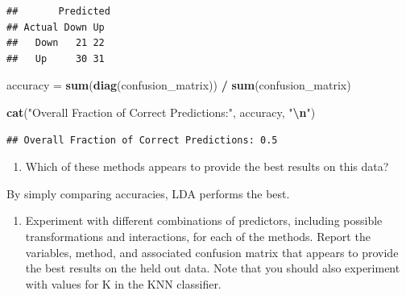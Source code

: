 \documentclass[
]{article}
\newenvironment{Shaded}{\begin{snugshade}}{\end{snugshade}}
\newcommand{\AttributeTok}[1]{\textcolor[rgb]{0.13,0.29,0.53}{#1}}
\newcommand{\DecValTok}[1]{\textcolor[rgb]{0.00,0.00,0.81}{#1}}
\newcommand{\FunctionTok}[1]{\textcolor[rgb]{0.13,0.29,0.53}{\textbf{#1}}}
\newcommand{\NormalTok}[1]{#1}
\newcommand{\OtherTok}[1]{\textcolor[rgb]{0.56,0.35,0.01}{#1}}
\newcommand{\SpecialCharTok}[1]{\textcolor[rgb]{0.81,0.36,0.00}{\textbf{#1}}}
\newcommand{\StringTok}[1]{\textcolor[rgb]{0.31,0.60,0.02}{#1}}
\providecommand{\tightlist}{%
  \setlength{\itemsep}{0pt}\setlength{\parskip}{0pt}}
\begin{document}
\begin{Shaded}
\end{Shaded}

\begin{verbatim}
##       Predicted
## Actual Down Up
##   Down   21 22
##   Up     30 31
\end{verbatim}

\begin{Shaded}
\begin{Highlighting}[]
\NormalTok{accuracy }\OtherTok{=} \FunctionTok{sum}\NormalTok{(}\FunctionTok{diag}\NormalTok{(confusion\_matrix)) }\SpecialCharTok{/} \FunctionTok{sum}\NormalTok{(confusion\_matrix)}

\FunctionTok{cat}\NormalTok{(}\StringTok{"Overall Fraction of Correct Predictions:"}\NormalTok{, accuracy, }\StringTok{"}\SpecialCharTok{\textbackslash{}n}\StringTok{"}\NormalTok{)}
\end{Highlighting}
\end{Shaded}

\begin{verbatim}
## Overall Fraction of Correct Predictions: 0.5
\end{verbatim}

\begin{enumerate}
\def\labelenumi{(\alph{enumi})}
\setcounter{enumi}{7}
\tightlist
\item
  Which of these methods appears to provide the best results on this
  data?
\end{enumerate}

By simply comparing accuracies, LDA performs the best.

\begin{enumerate}
\def\labelenumi{(\roman{enumi})}
\tightlist
\item
  Experiment with different combinations of predictors, including
  possible transformations and interactions, for each of the methods.
  Report the variables, method, and associated confusion matrix that
  appears to provide the best results on the held out data. Note that
  you should also experiment with values for K in the KNN classifier.
\end{enumerate}
\end{document}
